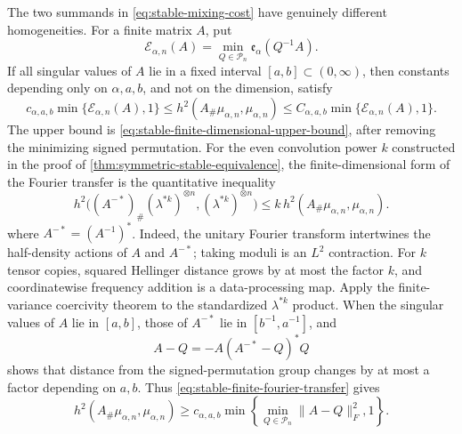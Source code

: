 The two summands in \eqref{eq:stable-mixing-cost} have genuinely different
homogeneities.
For a finite matrix \(A\), put
\[
 \mathcal E_{\alpha,n}(A)
 =\min_{Q\in\mathcal P_n}\mathfrak e_\alpha(Q^{-1}A).
\]
If all singular values of \(A\) lie in a fixed interval
\([a,b]\subset(0,\infty)\), then constants depending only on
\(\alpha,a,b\), and not on the dimension, satisfy
\begin{equation}
 c_{\alpha,a,b}\min\{\mathcal E_{\alpha,n}(A),1\}
 \le h^2(A_\#\mu_{\alpha,n},\mu_{\alpha,n})
 \le C_{\alpha,a,b}\min\{\mathcal E_{\alpha,n}(A),1\}.
 \label{eq:stable-hellinger-coercivity}
\end{equation}
The upper bound is \eqref{eq:stable-finite-dimensional-upper-bound}, after
removing the minimizing signed permutation.
For the even convolution power \(k\) constructed in the proof of
\cref{thm:symmetric-stable-equivalence}, the finite-dimensional form of the
Fourier transfer is the quantitative inequality
\begin{equation}
 h^2\bigl((A^{-*})_\#(\lambda^{*k})^{\otimes n},
                 (\lambda^{*k})^{\otimes n}\bigr)
 \le k\,h^2(A_\#\mu_{\alpha,n},\mu_{\alpha,n}).
 \label{eq:stable-finite-fourier-transfer}
\end{equation}
where \(A^{-*}=(A^{-1})^*\).
Indeed, the unitary Fourier transform intertwines the half-density actions
of \(A\) and \(A^{-*}\); taking moduli is an \(L^2\) contraction.
For \(k\) tensor copies, squared Hellinger distance grows by at most the
factor \(k\), and coordinatewise frequency addition is a data-processing
map.
Apply the finite-variance coercivity theorem to the standardized
\(\lambda^{*k}\) product.
When the singular values of \(A\) lie in \([a,b]\), those of \(A^{-*}\)
lie in \([b^{-1},a^{-1}]\), and
\[
 A-Q=-A(A^{-*}-Q)^*Q
\]
shows that distance from the signed-permutation group changes by at most a
factor depending on \(a,b\).
Thus \eqref{eq:stable-finite-fourier-transfer} gives
\begin{equation}
 h^2(A_\#\mu_{\alpha,n},\mu_{\alpha,n})
 \ge c_{\alpha,a,b}
     \min\left\{\min_{Q\in\mathcal P_n}\|A-Q\|_F^2,1\right\}.
 \label{eq:stable-quadratic-lower-bound}
\end{equation}

